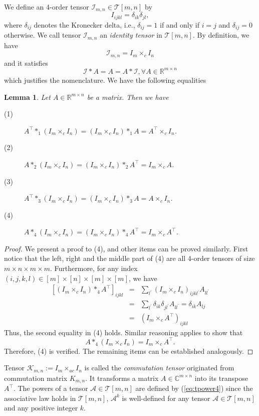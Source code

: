 \documentclass[11pt, oneside]{article}  %
\newtheorem{lem}[thm]{Lemma}
\newcommand{\p}{\prime}
\newcommand{\bbC}{\mathbb{C}}
\newcommand{\RR}{\mathbb{R}}
\newcommand{\A}{\mathcal{A}}
\newcommand{\caI}{\mathcal{I}}
\newcommand{\caK}{\mathcal{K}}
\newcommand{\T}{\mathcal{T}}
\newcommand{\beq}{\begin{equation}}
\newcommand{\eeq}{\end{equation}}
\newcommand{\beyy}{\begin{eqnarray*}}
\newcommand{\eeyy}{\end{eqnarray*}}
\begin{document}
We define an 4-order tensor $\caI_{m,n} \in \T[m,n]$ by  
\beq\label{eq2-4-1:iden}
I_{ijkl} = \delta_{ik} \delta_{jl},
\eeq  
where $\delta_{ij}$ denotes the Kronecker delta, i.e., $\delta_{ij}=1$ if and only if $i=j$ and $\delta_{ij}=0$ otherwise. We call tensor 
$\caI_{m,n}$ an \emph{identity tensor} in $\T[m,n]$. By definition, we have 
\beq\label{eq2-4-2:iden}
\caI_{m,n} = I_m \times_c I_n
\eeq
and it satisfies  
\beq\label{eq2-4-3} 
\caI\ast A = A = A\ast \caI, \forall  A\in\RR^{m\times n}
\eeq
which justifies the nomenclature. We have the following equalities       
\begin{lem}\label{le2-4-1}
Let $A\in\RR^{m\times n}$ be a matrix.  Then we have 
\begin{description}
\item[(1)] $A^{\top}\ast_1 (I_m\times_{c} I_n)=(I_m\times_c I_n)\ast_1 A = A^{\top}\times_{c} I_n$.
\item[(2)] $A\ast_2 (I_m\times_{c} I_n)=(I_m\times_c I_n)\ast_2 A^{\top} = I_{m}\times_{c}A$.
\item[(3)] $A^{\top}\ast_3 (I_m\times_{c} I_n)=(I_m\times_c I_n)\ast_3 A=A\times_{c} I_n$.
\item[(4)] $A\ast_4 (I_m\times_{c} I_n)=(I_m\times_c I_n)\ast_4 A^{\top} = I_{m}\times_{c}A^{\top}$.
\end{description}
\end{lem}  
\begin{proof}
We present a proof to (4), and other items can be proved similarly.  First notice that the left, right and the middle part of  (4) are all 
4-order tensors of size 
$m\times n\times m\times m$. Furthermore,  for any index $(i,j,k,l)\in [m]\times [n]\times [m]\times [m]$, we have 
\beyy
\left[(I_{m}\times_{c} I_{n})\ast_{4} A^{\top}\right]_{ijkl} 
& =& \sum_{l^{\p}}(I_{m}\times_{c} I_{n})_{ijkl^{\p}}A_{ll^{\p}} \\
& =& \sum_{l^{\p}}\delta_{ik} \delta_{jl^{\p}}A_{ll^{\p}} =\delta_{ik} A_{lj}\\
& =& (I_{m}\times_{c} A^{\top})_{ijkl}    
\eeyy 
Thus, the second equality in (4) holds. Similar reasoning applies to show that 
\[ A\ast_4 (I_m\times_{c} I_n) = I_{m}\times_{c}A^{\top}. \] 
Therefore, (4) is verified. The remaining items can be established analogously.
\end{proof}
 
Tensor $\caK_{m,n}:= I_{m}\times_{ac} I_{n}$ is called the \emph{commutation tensor} originated from commutation matrix $K_{m,n}$. It
transforms a matrix $A\in\bbC^{m\times n}$ into its transpose $A^{\top}$\cite{XHL2018}.  The powers of a tensor $\A\in\T[m,n]$ are defined 
by (\ref{eq:tpower4}) since the associative law holds in $\T[m,n]$,  $\A^{k}$ is well-defined for any tensor $\A\in\T[m,n]$ and any positive integer $k$.  
\end{document}

